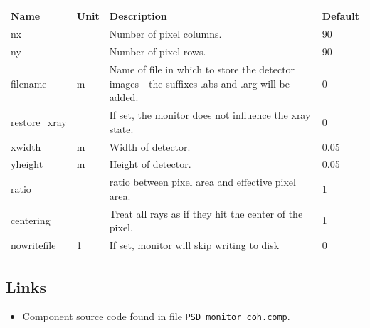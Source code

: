 \begin{longtable}{p{}p{}p{}p{}}
\toprule
\textbf{Name} & \textbf{Unit} & \textbf{Description} & \textbf{Default} \\
\midrule
\endhead
nx &   & Number of pixel columns. & 90 \\
ny &   & Number of pixel rows. & 90 \\
filename & m & Name of file in which to store the detector images - the suffixes .abs and .arg will be added. & 0 \\
restore\_xray &   & If set, the monitor does not influence the xray state. & 0 \\
xwidth & m & Width of detector. & 0.05 \\
yheight & m & Height of detector. & 0.05 \\
ratio &   & ratio between pixel area and effective pixel area. & 1 \\
centering &   & Treat all rays as if they hit the center of the pixel. & 1 \\
nowritefile & 1 & If set, monitor will skip writing to disk & 0 \\
\bottomrule
\end{longtable}

\subsection*{Links}
\begin{itemize}
  \item Component source code found in file \texttt{PSD\_monitor\_coh.comp}.
\end{itemize}
